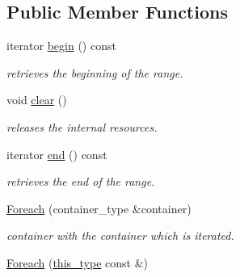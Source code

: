 \subsection*{Public Member Functions}
\begin{DoxyCompactItemize}
\item 
\hypertarget{classhryky_1_1_foreach_af92e7d3b0f4b07a22856f64ade36f456}{iterator \hyperlink{classhryky_1_1_foreach_af92e7d3b0f4b07a22856f64ade36f456}{begin} () const }\label{classhryky_1_1_foreach_af92e7d3b0f4b07a22856f64ade36f456}

\begin{DoxyCompactList}\small\item\em retrieves the beginning of the range. \end{DoxyCompactList}\item 
\hypertarget{classhryky_1_1_foreach_a2b0583cb5e910f561c8bc2e2c87cc37e}{void \hyperlink{classhryky_1_1_foreach_a2b0583cb5e910f561c8bc2e2c87cc37e}{clear} ()}\label{classhryky_1_1_foreach_a2b0583cb5e910f561c8bc2e2c87cc37e}

\begin{DoxyCompactList}\small\item\em releases the internal resources. \end{DoxyCompactList}\item 
\hypertarget{classhryky_1_1_foreach_abc6a85f2269646d8f110df39aff5555e}{iterator \hyperlink{classhryky_1_1_foreach_abc6a85f2269646d8f110df39aff5555e}{end} () const }\label{classhryky_1_1_foreach_abc6a85f2269646d8f110df39aff5555e}

\begin{DoxyCompactList}\small\item\em retrieves the end of the range. \end{DoxyCompactList}\item 
\hypertarget{classhryky_1_1_foreach_af47d8a0d8fc0256928e8fdf293bc1b9a}{\hyperlink{classhryky_1_1_foreach_af47d8a0d8fc0256928e8fdf293bc1b9a}{Foreach} (container\-\_\-type \&container)}\label{classhryky_1_1_foreach_af47d8a0d8fc0256928e8fdf293bc1b9a}

\begin{DoxyCompactList}\small\item\em container with the container which is iterated. \end{DoxyCompactList}\item 
\hypertarget{classhryky_1_1_foreach_a7d4e81ae23eccd7c85a2730cdd74fe3e}{\hyperlink{classhryky_1_1_foreach_a7d4e81ae23eccd7c85a2730cdd74fe3e}{Foreach} (\hyperlink{classhryky_1_1_foreach_a57418e3f3130d8e58f62b54d6c209798}{this\-\_\-type} const \&)}\label{classhryky_1_1_foreach_a7d4e81ae23eccd7c85a2730cdd74fe3e}


\end{DoxyCompactItemize}
